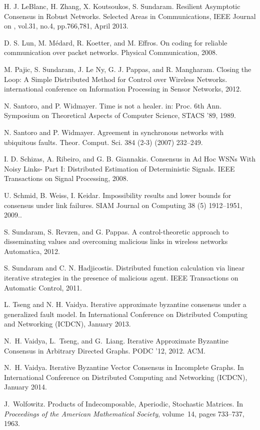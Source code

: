 \documentclass{llncs}
\begin{document}
\begin{thebibliography}{10}
H. J. LeBlanc, H. Zhang, X. Koutsoukos, S. Sundaram.
\newblock Resilient Asymptotic Consensus in Robust Networks.
\newblock Selected Areas in Communications, IEEE Journal on , vol.31, no.4, pp.766,781, April 2013.

D. S. Lun, M. M{\'e}dard, R. Koetter, and M. Effros.
\newblock On coding for reliable communication over packet networks.
\newblock Physical Communication, 2008.

M. Pajic, S. Sundaram, J. Le Ny, G. J. Pappas, and R. Mangharam.
\newblock Closing the Loop: A Simple Distributed Method for Control
over Wireless Networks.
\newblock international conference on Information Processing in Sensor Networks, 2012.


N. Santoro, and P. Widmayer. 
\newblock Time is not a healer.
\newblock in: Proc. 6th Ann. Symposium on Theoretical Aspects of Computer Science, STACS '89, 1989.

N. Santoro and P. Widmayer.
\newblock Agreement in synchronous networks with ubiquitous faults.
\newblock Theor. Comput. Sci. 384 (2-3) (2007) 232–249.

I. D. Schizas, A. Ribeiro, and G. B. Giannakis. 
\newblock Consensus in Ad Hoc WSNs With Noisy Links- Part I: Distributed Estimation of Deterministic Signals.
\newblock IEEE Transactions on Signal Processing, 2008.

U. Schmid, B. Weiss, I. Keidar.
\newblock Impossibility results and lower bounds for consensus under link failures.
\newblock SIAM Journal on Computing 38 (5) 1912–1951, 2009..

S. Sundaram, S. Revzen, and G. Pappas.
\newblock A control-theoretic approach to disseminating values and overcoming malicious links in wireless networks
\newblock Automatica, 2012.

S. Sundaram and C. N. Hadjicostis.
\newblock Distributed function calculation via linear iterative strategies in the presence of malicious agent.
\newblock IEEE Transactions on Automatic Control, 2011.

L. Tseng and N. H. Vaidya. 
\newblock Iterative approximate byzantine consensus under a generalized fault model.
\newblock In International Conference on Distributed Computing and Networking (ICDCN), January 2013.

N.~H. Vaidya, L.~Tseng, and G.~Liang.
\newblock Iterative Approximate Byzantine Consensus in Arbitrary Directed
  Graphs.
\newblock PODC '12, 2012. ACM.

N.~H. Vaidya.
\newblock Iterative Byzantine Vector Consensus in Incomplete Graphs.
\newblock In International Conference on Distributed Computing and Networking (ICDCN), January 2014.


J.~Wolfowitz.
\newblock Products of Indecomposable, Aperiodic, Stochastic Matrices.
\newblock In {\em Proceedings of the American Mathematical Society}, volume~14,
  pages 733--737, 1963.
\end{thebibliography}
\end{document}
